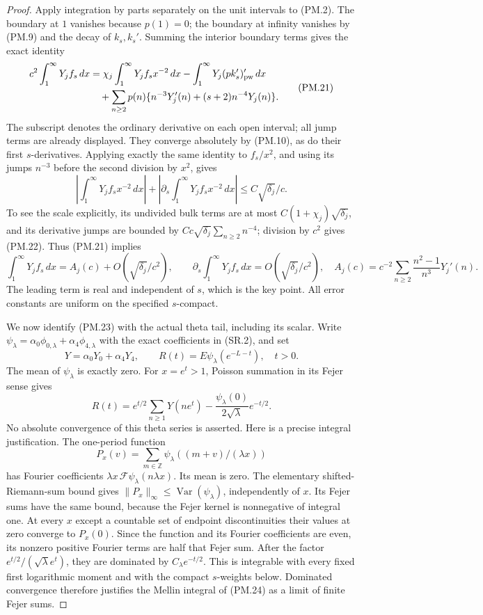 \begin{proof}
Apply integration by parts separately on the unit intervals to (PM.2).
The boundary at \(1\) vanishes because \(p(1)=0\); the boundary at
infinity vanishes by (PM.9) and the decay of \(k_s,k_s'\).  Summing
the interior boundary terms gives the exact identity
\[
\begin{split}
 c^2\int_1^\infty Y_j f_s\,dx
 &=\chi_j\int_1^\infty Y_j f_sx^{-2}\,dx
     -\int_1^\infty Y_j(pk_s')'_{\rm pw}\,dx\\
 &\quad+\sum_{n\ge2}p(n)
       \{n^{-3}Y_j'(n)+(s+2)n^{-4}Y_j(n)\}.
\end{split}
 \tag{PM.21}
\]
The subscript denotes the ordinary derivative on each open interval;
all jump terms are already displayed.  They converge absolutely by
(PM.10), as do their first \(s\)-derivatives.  Applying exactly the
same identity to \(f_s/x^2\), and using its jumps \(n^{-3}\) before
the second division by \(x^2\), gives
\[
 \left|\int_1^\infty Y_j f_sx^{-2}\,dx\right|
  +\left|\partial_s\int_1^\infty Y_j f_sx^{-2}\,dx\right|
                         \le C\sqrt{\delta_j}/c.
 \tag{PM.22}
\]
To see the scale explicitly, its undivided bulk terms are at most
\(C(1+\chi_j)\sqrt{\delta_j}\), and its derivative jumps are bounded
by \(Cc\sqrt{\delta_j}\sum_{n\ge2}n^{-4}\); division by \(c^2\)
gives (PM.22).  Thus (PM.21) implies
\[
 \int_1^\infty Y_j f_s\,dx=A_j(c)+O(\sqrt{\delta_j}/c^2),\qquad
 \partial_s\int_1^\infty Y_j f_s\,dx=O(\sqrt{\delta_j}/c^2),
 \quad
 A_j(c)=c^{-2}\sum_{n\ge2}\frac{n^2-1}{n^3}Y_j'(n).
 \tag{PM.23}
\]
The leading term is real and independent of \(s\), which is the key
point.  All error constants are uniform on the specified \(s\)-compact.

We now identify (PM.23) with the actual theta tail, including its scalar.
Write \(\psi_\lambda=\alpha_0\phi_{0,\lambda}+\alpha_4\phi_{4,\lambda}\)
with the exact coefficients in (SR.2), and set
\[
 Y=\alpha_0Y_0+\alpha_4Y_4,\qquad
 R(t)=E\psi_\lambda(e^{-L-t}),\quad t>0.
\]
The mean of \(\psi_\lambda\) is exactly zero.  For \(x=e^t>1\),
Poisson summation in its Fejer sense gives
\[
 R(t)=e^{t/2}\sum_{n\ge1}Y(ne^t)
              -\frac{\psi_\lambda(0)}{2\sqrt\lambda}e^{-t/2}.
 \tag{PM.24}
\]
No absolute convergence of this theta series is asserted.  Here is a
precise integral justification.  The one-period function
\[
 P_x(v)=\sum_{m\in\mathbb Z}
                 \psi_\lambda((m+v)/(\lambda x))
\]
has Fourier coefficients \(\lambda x\,\mathcal F\psi_\lambda(n\lambda x)\).
Its mean is zero.  The elementary shifted-Riemann-sum bound gives
\(\|P_x\|_\infty\le\operatorname{Var}(\psi_\lambda)\), independently
of \(x\).  Its Fejer sums have the same bound, because the Fejer kernel
is nonnegative of integral one.  At every \(x\) except a countable set
of endpoint discontinuities their values at zero converge to \(P_x(0)\).
Since the function and its Fourier coefficients are even, its nonzero
positive Fourier terms are half that Fejer sum.  After the factor
\(e^{t/2}/(\sqrt\lambda e^t)\), they are dominated by
\(C_\lambda e^{-t/2}\).  This is integrable with every fixed first
logarithmic moment and with the compact \(s\)-weights below.
Dominated convergence therefore justifies the Mellin integral of
(PM.24) as a limit of finite Fejer sums.


\end{proof}
